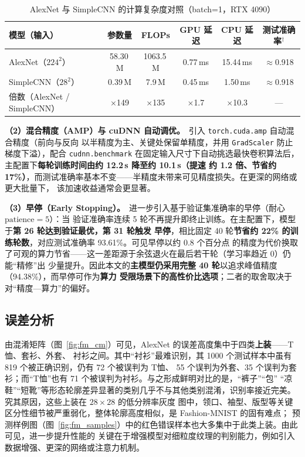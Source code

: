 \documentclass[12pt,a4paper,fontset=fandol]{ctexart}   %
\numberwithin{figure}{section}
\numberwithin{table}{section}
\numberwithin{equation}{section}
\begin{document}
\begin{table}[H]
  \centering
  \caption{AlexNet 与 SimpleCNN 的计算复杂度对照（batch=1，RTX 4090）}
  \label{tab:complexity}
  \begin{tabular}{lccccc}
    \toprule
    模型（输入） & 参数量 & FLOPs & GPU 延迟 & CPU 延迟 & 测试准确率$^\dagger$ \\
    \midrule
    AlexNet（$224^2$）  & 58.30\,M & 1063.5\,M & 0.77\,ms & 15.44\,ms & $\approx$0.918 \\
    SimpleCNN（$28^2$） & 0.39\,M & 7.9\,M & 0.45\,ms & 1.50\,ms & $\approx$0.918 \\
    \midrule
    倍数（AlexNet / SimpleCNN） & $\times$149 & $\times$135 & $\times$1.7 & $\times$10.3 & --- \\
    \bottomrule
  \end{tabular}
\end{table}


\textbf{（2）混合精度（AMP）与 cuDNN 自动调优。}\ 引入 \texttt{torch.cuda.amp} 自动混合精度（前向与反向
以半精度为主、关键处保留单精度，并用 \texttt{GradScaler} 防止梯度下溢），配合 \texttt{cudnn.benchmark}
在固定输入尺寸下自动挑选最快卷积算法后，主配置下\textbf{每轮训练时间由约 12.2\,s 降至约 10.1\,s（提速
约 1.2 倍、节省约 17\%）}，而测试准确率基本不变——半精度未带来可见精度损失。在更深的网络或更大批量下，
该加速收益通常会更显著。

\textbf{（3）早停（Early Stopping）。}\ 进一步引入基于验证集准确率的早停（耐心 $\text{patience}=5$）：当
验证准确率连续 5 轮不再提升即终止训练。在主配置下，模型于\textbf{第 26 轮达到验证最优，第 31 轮触发
早停}，相比固定 40 轮\textbf{节省约 22\% 的训练轮数}，对应测试准确率 93.61\%。可见早停以约 0.8 个百分点
的精度为代价换取了可观的算力节省——这一差距源于余弦退火在最后若干轮（学习率趋近 0）仍能“精修”出
少量提升。因此本文的\textbf{主模型仍采用完整 40 轮}以追求峰值精度（94.38\%），而早停可作为\textbf{算力
受限场景下的高性价比选项}；二者的取舍取决于对“精度—算力”的偏好。

\subsection{误差分析}
由混淆矩阵（图~\ref{fig:fm_cm}）可见，AlexNet 的误差高度集中于四类\textbf{上装}——T恤、套衫、外套、
衬衫之间。其中“衬衫”最难识别，其 1000 个测试样本中虽有 819 个被正确识别，仍有 72 个被误判为 T恤、
55 个误判为外套、35 个误判为套衫；而“T恤”也有 71 个被误判为衬衫。与之形成鲜明对比的是，“裤子”“包”
“凉鞋”“短靴”等形态轮廓差异显著的类别几乎不与其他类别混淆，识别率接近完美。究其原因，这些上装在 $28\times28$ 的低分辨率灰度
图中，领口、袖型、版型等关键区分性细节被严重弱化，整体轮廓高度相似，是 Fashion-MNIST 的固有难点；
预测样例图（图~\ref{fig:fm_samples}）中的红色错误样本也大多集中于此类上装。由此可见，进一步提升性能的
关键在于增强模型对细粒度纹理的判别能力，例如引入数据增强、更深的网络或注意力机制。
\end{document}
